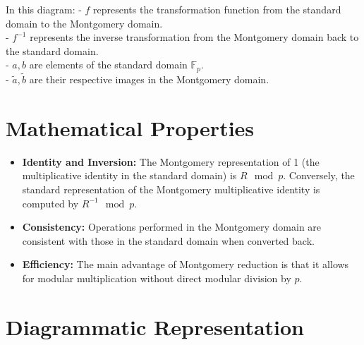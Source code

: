 \begin{center}
\end{center}


In this diagram:
- $f$ represents the transformation function from the standard domain to the Montgomery domain.\\
- $f^{-1}$ represents the inverse transformation from the Montgomery domain back to the standard domain.\\
- $a, b$ are elements of the standard domain $\mathbb{F}_p$.\\
- $\widetilde{a}, \widetilde{b}$ are their respective images in the Montgomery domain.


\section*{Mathematical Properties}

\begin{itemize}
	\item \textbf{Identity and Inversion:} The Montgomery representation of 1 (the multiplicative identity in the standard domain) is $R \mod p$. Conversely, the standard representation of the Montgomery multiplicative identity is computed by $R^{-1} \mod p$.
	\item \textbf{Consistency:} Operations performed in the Montgomery domain are consistent with those in the standard domain when converted back.
	\item \textbf{Efficiency:} The main advantage of Montgomery reduction is that it allows for modular multiplication without direct modular division by $p$.
\end{itemize}

\section*{Diagrammatic Representation}

